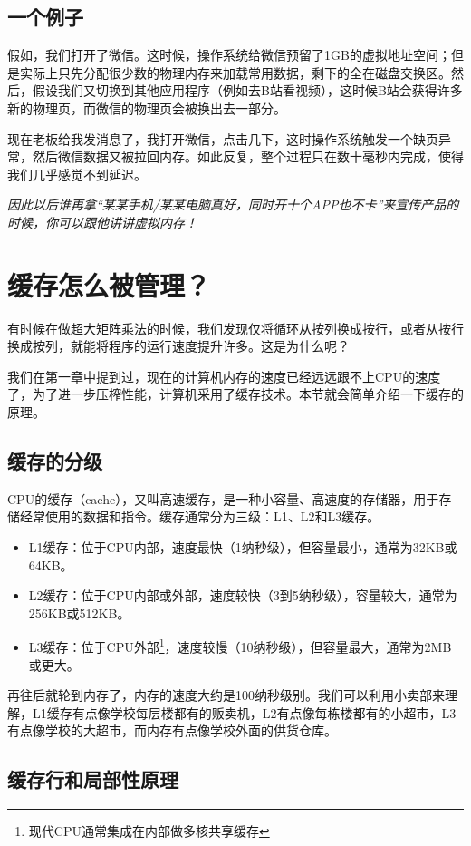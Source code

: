 \documentclass[../main.tex]{subfiles}
\begin{document}
\subsection{一个例子}

假如，我们打开了微信。这时候，操作系统给微信预留了1GB的虚拟地址空间；但是实际上只先分配很少数的物理内存来加载常用数据，剩下的全在磁盘交换区。然后，假设我们又切换到其他应用程序（例如去B站看视频），这时候B站会获得许多新的物理页，而微信的物理页会被换出去一部分。

现在老板给我发消息了，我打开微信，点击几下，这时操作系统触发一个缺页异常，然后微信数据又被拉回内存。如此反复，整个过程只在数十毫秒内完成，使得我们几乎感觉不到延迟。

\emph{因此以后谁再拿“某某手机/某某电脑真好，同时开十个APP也不卡”来宣传产品的时候，你可以跟他讲讲虚拟内存！}

\section{缓存怎么被管理？}

有时候在做超大矩阵乘法的时候，我们发现仅将循环从按列换成按行，或者从按行换成按列，就能将程序的运行速度提升许多。这是为什么呢？

我们在第一章中提到过，现在的计算机内存的速度已经远远跟不上CPU的速度了，为了进一步压榨性能，计算机采用了缓存技术。本节就会简单介绍一下缓存的原理。

\subsection{缓存的分级}

CPU的缓存（cache），又叫高速缓存，是一种小容量、高速度的存储器，用于存储经常使用的数据和指令。缓存通常分为三级：L1、L2和L3缓存。
\begin{itemize}
  \item L1缓存：位于CPU内部，速度最快（1纳秒级），但容量最小，通常为32KB或64KB。
  \item L2缓存：位于CPU内部或外部，速度较快（3到5纳秒级），容量较大，通常为256KB或512KB。
  \item L3缓存：位于CPU外部\footnote{现代CPU通常集成在内部做多核共享缓存}，速度较慢（10纳秒级），但容量最大，通常为2MB或更大。
\end{itemize}
再往后就轮到内存了，内存的速度大约是100纳秒级别。我们可以利用小卖部来理解，L1缓存有点像学校每层楼都有的贩卖机，L2有点像每栋楼都有的小超市，L3有点像学校的大超市，而内存有点像学校外面的供货仓库。

\subsection{缓存行和局部性原理}
\end{document}
